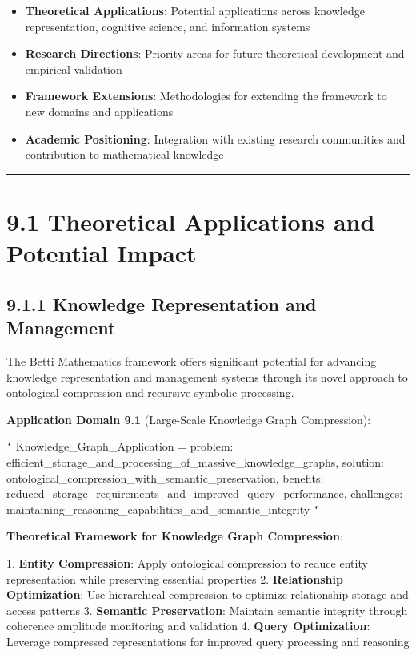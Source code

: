 \begin{itemize}
\item \textbf{Theoretical Applications}: Potential applications across knowledge representation, cognitive science, and information systems
\item \textbf{Research Directions}: Priority areas for future theoretical development and empirical validation
\item \textbf{Framework Extensions}: Methodologies for extending the framework to new domains and applications
\item \textbf{Academic Positioning}: Integration with existing research communities and contribution to mathematical knowledge
\end{itemize}

\hrule

\section{9.1 Theoretical Applications and Potential Impact}

\subsection{9.1.1 Knowledge Representation and Management}

The Betti Mathematics framework offers significant potential for advancing knowledge representation and management systems through its novel approach to ontological compression and recursive symbolic processing.

\textbf{Application Domain 9.1} (Large-Scale Knowledge Graph Compression): 

\texttt{`}
Knowledge_Graph_Application = {
    problem: efficient_storage_and_processing_of_massive_knowledge_graphs,
    solution: ontological_compression_with_semantic_preservation,
    benefits: reduced_storage_requirements_and_improved_query_performance,
    challenges: maintaining_reasoning_capabilities_and_semantic_integrity
}
\texttt{`}

\textbf{Theoretical Framework for Knowledge Graph Compression}:

1. \textbf{Entity Compression}: Apply ontological compression to reduce entity representation while preserving essential properties
2. \textbf{Relationship Optimization}: Use hierarchical compression to optimize relationship storage and access patterns
3. \textbf{Semantic Preservation}: Maintain semantic integrity through coherence amplitude monitoring and validation
4. \textbf{Query Optimization}: Leverage compressed representations for improved query processing and reasoning

